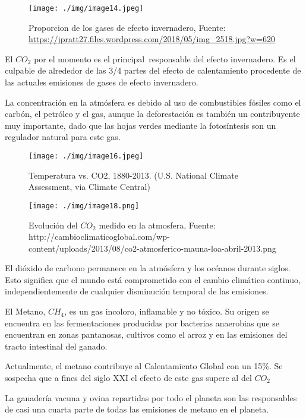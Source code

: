 \documentclass[
  a4paper,12pt]{extarticle}
\begin{document}
\begin{figure}
\centering
\texttt{[image: ./img/image14.jpeg]}
\caption{Proporcion de los gases de efecto invernadero, Fuente:
\url{https://jpratt27.files.wordpress.com/2018/05/img_2518.jpg?w=620}}
\end{figure}

El \(CO_2\) por el momento es el principal~responsable del efecto
invernadero. Es el culpable de alrededor de las 3/4 partes del efecto de
calentamiento procedente de las actuales emisiones de gases de efecto
invernadero.

La concentración en la atmósfera es debido al uso de combustibles
fósiles como el carbón, el petróleo y el gas, aunque la deforestación es
también un contribuyente muy importante, dado que las hojas verdes
mediante la fotosíntesis son un regulador natural para este gas.

\begin{figure}
\begin{minipage}{0.48\textwidth}

\texttt{[image: ./img/image16.jpeg]}

\caption{ Temperatura vs. CO2, 1880-2013. (U.S. National Climate Assessment, via Climate Central) }
\end{minipage}%
\begin{minipage}{0.48\textwidth}

\texttt{[image: ./img/image18.png]}

\caption{Evolución del $CO_2$ medido en la atmosfera, Fuente: http://cambioclimaticoglobal.com/wp-content/uploads/2013/08/co2-atmosferico-mauna-loa-abril-2013.png}
\end{minipage}
\end{figure}

El dióxido de carbono permanece en la atmósfera y los océanos durante
siglos. Esto significa que el mundo está comprometido con el cambio
climático continuo, independientemente de cualquier disminución temporal
de las emisiones.

El Metano, \(CH_4\), es un gas incoloro, inflamable y no tóxico. Su
origen se encuentra en las fermentaciones producidas por bacterias
anaerobias que se encuentran en zonas pantanosas, cultivos como el arroz
y en las emisiones del tracto intestinal del ganado.

Actualmente, el metano contribuye al Calentamiento Global con un 15\%.
Se sospecha que a fines del siglo XXI el efecto de este gas supere al
del \(CO_2\)

La ganadería vacuna y ovina repartidas por todo el planeta son las
responsables de casi una cuarta parte de todas las emisiones de metano
en el planeta.
\end{document}
